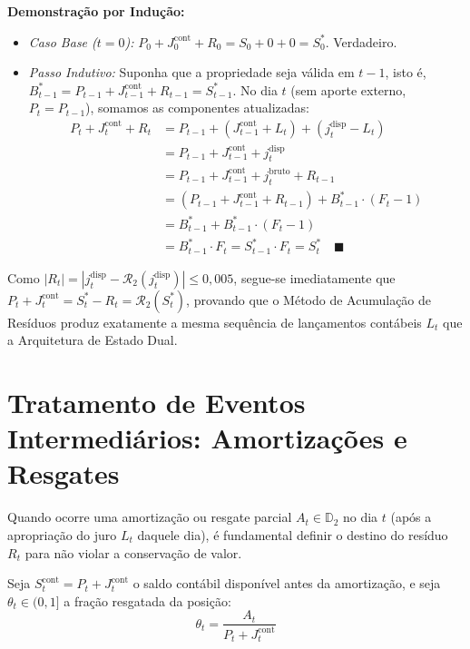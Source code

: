 \documentclass[11pt, a4paper]{article}
\begin{document}
\textbf{Demonstração por Indução:}
\begin{itemize}
    \item \textit{Caso Base ($t = 0$):} $P_0 + J_0^{\text{cont}} + R_0 = S_0 + 0 + 0 = S_0^{*}$. Verdadeiro.
    \item \textit{Passo Indutivo:} Suponha que a propriedade seja válida em $t - 1$, isto é, $B_{t-1}^{*} = P_{t-1} + J_{t-1}^{\text{cont}} + R_{t-1} = S_{t-1}^{*}$. No dia $t$ (sem aporte externo, $P_t = P_{t-1}$), somamos as componentes atualizadas:
    \begin{align}
        P_t + J_t^{\text{cont}} + R_t &= P_{t-1} + \left( J_{t-1}^{\text{cont}} + L_t \right) + \left( j_t^{\text{disp}} - L_t \right) \\
        &= P_{t-1} + J_{t-1}^{\text{cont}} + j_t^{\text{disp}} \\
        &= P_{t-1} + J_{t-1}^{\text{cont}} + j_t^{\text{bruto}} + R_{t-1} \\
        &= \left( P_{t-1} + J_{t-1}^{\text{cont}} + R_{t-1} \right) + B_{t-1}^{*} \cdot (F_t - 1) \\
        &= B_{t-1}^{*} + B_{t-1}^{*} \cdot (F_t - 1) \\
        &= B_{t-1}^{*} \cdot F_t = S_{t-1}^{*} \cdot F_t = S_t^{*} \quad \blacksquare
    \end{align}
\end{itemize}

Como $|R_t| = |j_t^{\text{disp}} - \mathcal{R}_2(j_t^{\text{disp}})| \le 0{,}005$, segue-se imediatamente que $P_t + J_t^{\text{cont}} = S_t^{*} - R_t = \mathcal{R}_2(S_t^{*})$, provando que o Método de Acumulação de Resíduos produz exatamente a mesma sequência de lançamentos contábeis $L_t$ que a Arquitetura de Estado Dual.

\section{Tratamento de Eventos Intermediários: Amortizações e Resgates}

Quando ocorre uma amortização ou resgate parcial $A_t \in \mathbb{D}_2$ no dia $t$ (após a apropriação do juro $L_t$ daquele dia), é fundamental definir o destino do resíduo $R_t$ para não violar a conservação de valor.

Seja $S_t^{\text{cont}} = P_t + J_t^{\text{cont}}$ o saldo contábil disponível antes da amortização, e seja $\theta_t \in (0, 1]$ a fração resgatada da posição:
\begin{equation}
    \theta_t = \frac{A_t}{P_t + J_t^{\text{cont}}}
\end{equation}
\end{document}
